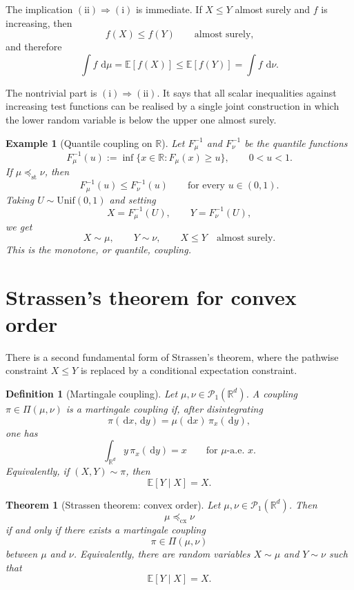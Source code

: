 \documentclass[11pt]{article}
\newtheorem{theorem}{Theorem}
\newtheorem{definition}{Definition}
\newtheorem{example}{Example}
\newcommand{\R}{\mathbb R}
\newcommand{\E}{\mathbb E}
\newcommand{\Pcal}{\mathcal P}
\newcommand{\dd}{\,\mathrm d}
\newcommand{\PiC}{\Pi}
\begin{document}
The implication \((\mathrm{ii})\Rightarrow(\mathrm{i})\) is immediate. If
\(X\leq Y\) almost surely and \(f\) is increasing, then
\[
        f(X)\leq f(Y)
        \qquad\text{almost surely,}
\]
and therefore
\[
        \int f\,\dd\mu
        =
        \E[f(X)]
        \leq
        \E[f(Y)]
        =
        \int f\,\dd\nu.
\]

The nontrivial part is \((\mathrm{i})\Rightarrow(\mathrm{ii})\). It says that
all scalar inequalities against increasing test functions can be realised by a
single joint construction in which the lower random variable is below the upper
one almost surely.

\begin{example}[Quantile coupling on \(\R\)]
Let \(F_\mu^{-1}\) and \(F_\nu^{-1}\) be the quantile functions
\[
        F_\mu^{-1}(u)
        :=
        \inf\{x\in\R:F_\mu(x)\geq u\},
        \qquad 0<u<1.
\]
If \(\mu\preceq_{\mathrm{st}}\nu\), then
\[
        F_\mu^{-1}(u)
        \leq
        F_\nu^{-1}(u)
        \qquad
        \text{for every } u\in(0,1).
\]
Taking \(U\sim\mathrm{Unif}(0,1)\) and setting
\[
        X=F_\mu^{-1}(U),
        \qquad
        Y=F_\nu^{-1}(U),
\]
we get
\[
        X\sim\mu,
        \qquad
        Y\sim\nu,
        \qquad
        X\leq Y \quad\text{almost surely.}
\]
This is the monotone, or quantile, coupling.
\end{example}

\section{Strassen's theorem for convex order}

There is a second fundamental form of Strassen's theorem, where the pathwise
constraint \(X\leq Y\) is replaced by a conditional expectation constraint.

\begin{definition}[Martingale coupling]
Let \(\mu,\nu\in\Pcal_1(\R^d)\). A coupling \(\pi\in\PiC(\mu,\nu)\) is a
martingale coupling if, after disintegrating
\[
        \pi(\dd x,\dd y)=\mu(\dd x)\,\pi_x(\dd y),
\]
one has
\[
        \int_{\R^d} y\,\pi_x(\dd y)=x
        \qquad
        \text{for } \mu\text{-a.e. }x.
\]
Equivalently, if \((X,Y)\sim\pi\), then
\[
        \E[Y\mid X]=X.
\]
\end{definition}

\begin{theorem}[Strassen theorem: convex order]
Let \(\mu,\nu\in\Pcal_1(\R^d)\). Then
\[
        \mu\preceq_{\mathrm{cx}}\nu
\]
if and only if there exists a martingale coupling
\[
        \pi\in\PiC(\mu,\nu)
\]
between \(\mu\) and \(\nu\). Equivalently, there are random variables
\(X\sim\mu\) and \(Y\sim\nu\) such that
\[
        \E[Y\mid X]=X.
\]
\end{theorem}
\end{document}
